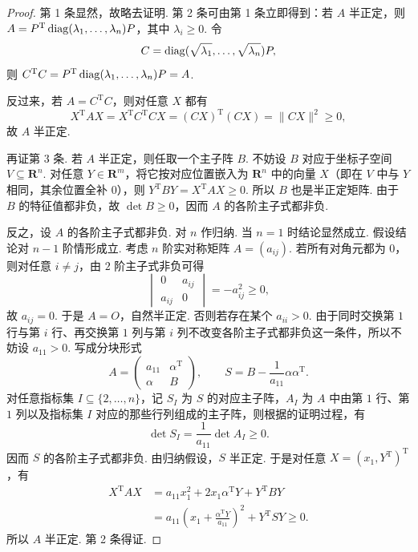 \begin{proof}
    第 1 条显然，故略去证明. 第 2 条可由第 1 条立即得到：若 $A$ 半正定，则 $A=P^\mathrm{T}\operatorname{diag}(\lambda_1,\ldots,\lambda_n)P$，其中 $\lambda_i\geqslant 0$. 令
    \[
        C=\operatorname{diag}(\sqrt{\lambda_1},\ldots,\sqrt{\lambda_n})P,
    \]
    则 $C^\mathrm{T}C=P^\mathrm{T}\operatorname{diag}(\lambda_1,\ldots,\lambda_n)P=A$.

    反过来，若 $A=C^\mathrm{T}C$，则对任意 $X$ 都有
    \[
        X^\mathrm{T}AX=X^\mathrm{T}C^\mathrm{T}CX=(CX)^\mathrm{T}(CX)=\|CX\|^2\geqslant 0,
    \]
    故 $A$ 半正定.

    再证第 3 条. 若 $A$ 半正定，则任取一个主子阵 $B$. 不妨设 $B$ 对应于坐标子空间 $V\subseteq \mathbf{R}^n$. 对任意 $Y\in\mathbf{R}^m$，将它按对应位置嵌入为 $\mathbf{R}^n$ 中的向量 $X$（即在 $V$ 中与 $Y$ 相同，其余位置全补 $0$），则 $Y^\mathrm{T}BY=X^\mathrm{T}AX\geqslant 0$. 所以 $B$ 也是半正定矩阵. 由于 $B$ 的特征值都非负，故 $\det B\geqslant 0$，因而 $A$ 的各阶主子式都非负.

    反之，设 $A$ 的各阶主子式都非负. 对 $n$ 作归纳. 当 $n = 1$ 时结论显然成立. 假设结论对 $n - 1$ 阶情形成立. 考虑 $n$ 阶实对称矩阵 $A=(a_{ij})$. 若所有对角元都为 $0$，则对任意 $i\neq j$，由 $2$ 阶主子式非负可得
    \[
        \begin{vmatrix}
            0 & a_{ij} \\
            a_{ij} & 0
        \end{vmatrix}
        =-a_{ij}^2\geqslant 0,
    \]
    故 $a_{ij}=0$. 于是 $A=O$，自然半正定. 否则若存在某个 $a_{ii} > 0$. 由于同时交换第 $1$ 行与第 $i$ 行、再交换第 $1$ 列与第 $i$ 列不改变各阶主子式都非负这一条件，所以不妨设 $a_{11} > 0$. 写成分块形式
    \[
        A=\begin{pmatrix}
            a_{11} & \alpha^\mathrm{T} \\
            \alpha & B
        \end{pmatrix},
        \qquad
        S=B-\frac{1}{a_{11}}\alpha\alpha^\mathrm{T}.
    \]
    对任意指标集 $I\subseteq\{2,\ldots,n\}$，记 $S_I$ 为 $S$ 的对应主子阵，$A_I$ 为 $A$ 中由第 $1$ 行、第 $1$ 列以及指标集 $I$ 对应的那些行列组成的主子阵，则根据的证明过程，有
    \[
        \det S_I=\frac{1}{a_{11}}\det A_I\geqslant 0.
    \]
    因而 $S$ 的各阶主子式都非负. 由归纳假设，$S$ 半正定. 于是对任意 $X=(x_1,Y^\mathrm{T})^\mathrm{T}$，有
    \begin{align*}
        X^\mathrm{T}AX
         & = a_{11}x_1^2+2x_1\alpha^\mathrm{T}Y+Y^\mathrm{T}BY \\
         & = a_{11}\left(x_1+\frac{\alpha^\mathrm{T}Y}{a_{11}}\right)^2+Y^\mathrm{T}SY \geqslant 0.
    \end{align*}
    所以 $A$ 半正定. 第 2 条得证.


\end{proof}
